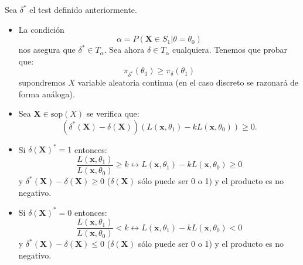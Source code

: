 \begin{enumerate}[label=\color{red}\textbf{\arabic*)}]
    Sea $\delta^*$ el test definido anteriormente.
             \begin{itemize}[label=\textbullet]
                           \item La condición \[
                                           \alpha=P(\mathbf{X}\in S_1|\theta=\theta_0)
                                                       \] nos asegura que $\delta^*\in T_\alpha$. Sea ahora $\delta\in T_\alpha$ cualquiera. Tenemos que probar que: \[
                                                                   \pi_{\delta^*}(\theta_1)\ge \pi_{\delta}(\theta_1)
                                                                               \] supondremos $X$ variable aleatoria continua (en el caso discreto se razonará de forma análoga).
                                                                                       \item Sea  $\mathbf{X}\in \mathrm{sop}(X)$ se verifica que: \[
                                                                                                           (\delta^*(\mathbf{X})-\delta(\mathbf{X}))(L(\mathbf{x},\theta_1)-kL(\mathbf{x},\theta_0))\ge 0.
                                                                                                                   \] 
                                                                                                                       \item Si $\delta(\mathbf{X})^*=1$ entonces: \[
                                                                                                                               \dfrac{L(\mathbf{x},\theta_1)}{L(\mathbf{x},\theta_0)}\ge k\longleftrightarrow L(\mathbf{x},\theta_1)-kL(\mathbf{x},\theta_0)\ge 0
                                                                                                                                   \] y $\delta^*(\mathbf{X})-\delta(\mathbf{X})\ge 0$ ($\delta(\mathbf{X})$ sólo puede ser 0 o 1) y el producto es no negativo.
                                                                                                                                 \item Si $\delta(\mathbf{X})^*=0$ entonces: \[
                                                                                                                                         \dfrac{L(\mathbf{x},\theta_1)}{L(\mathbf{x},\theta_0)}< k\longleftrightarrow L(\mathbf{x},\theta_1)-kL(\mathbf{x},\theta_0)< 0
                                                                                                                                       \] y $\delta^*(\mathbf{X})-\delta(\mathbf{X})\le 0$ ($\delta(\mathbf{X})$ sólo puede ser 0 o 1) y el producto es no negativo.

\end{itemize}
\end{enumerate}

